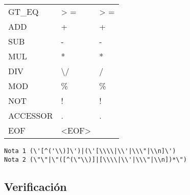 \documentclass [a4paper,abstracton,titlepage]{scrartcl}
\begin{document}
\begin{longtable}{l | l | l}
GT\_{}EQ           &
\textgreater{} =                                         &
\textgreater{} = %
 \tabularnewline

ADD             &
+                                           &
+ %
 \tabularnewline

SUB             &
-                                           &
- %
 \tabularnewline

MUL             &
*                                           &
* %
 \tabularnewline

DIV             &
\textbackslash{}/                                          &
/ %
 \tabularnewline

MOD             &
\%{}                                           &
\%{} %
 \tabularnewline

NOT             &
!                                           &
! %
 \tabularnewline

ACCESSOR        &
.                                           &
. %
 \tabularnewline

EOF             &
\textless{}EOF\textgreater{}                                       &
 \tabularnewline
 \end{longtable}

\begin{lstlisting}
Nota 1 (\'[^('\\)]\')|(\'[\\\\|\\'|\\\"|\\n]\')
Nota 2 (\"\"|\"([^(\"\\)]|[\\\\|\\'|\\\"|\\n])*\")
\end{lstlisting}

\hypertarget{_verificación}{}
\subsection{Verificación}
\label{_verificación}
\hypertarget{_errores_detectados}{}
\end{document}
